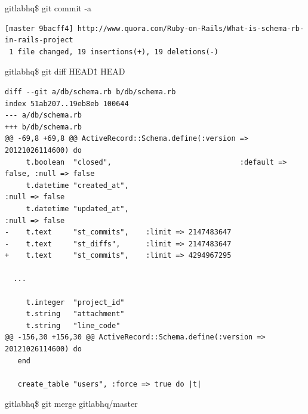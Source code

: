 \documentclass[times, utf8, seminar]{fit}
\begin{document}
gitlabhq\$ git commit -a

\begin{lstlisting}
[master 9bacff4] http://www.quora.com/Ruby-on-Rails/What-is-schema-rb-in-rails-project
 1 file changed, 19 insertions(+), 19 deletions(-)
\end{lstlisting}



gitlabhq\$ git diff HEAD\^1 HEAD

\begin{lstlisting}
diff --git a/db/schema.rb b/db/schema.rb
index 51ab207..19eb8eb 100644
--- a/db/schema.rb
+++ b/db/schema.rb
@@ -69,8 +69,8 @@ ActiveRecord::Schema.define(:version => 20121026114600) do
     t.boolean  "closed",                              :default => false, :null => false
     t.datetime "created_at",                                             :null => false
     t.datetime "updated_at",                                             :null => false
-    t.text     "st_commits",    :limit => 2147483647
-    t.text     "st_diffs",      :limit => 2147483647
+    t.text     "st_commits",    :limit => 4294967295

  ...

     t.integer  "project_id"
     t.string   "attachment"
     t.string   "line_code"
@@ -156,30 +156,30 @@ ActiveRecord::Schema.define(:version => 20121026114600) do
   end
 
   create_table "users", :force => true do |t|
\end{lstlisting}


gitlabhq\$ git merge gitlabhq/master
\end{document}

